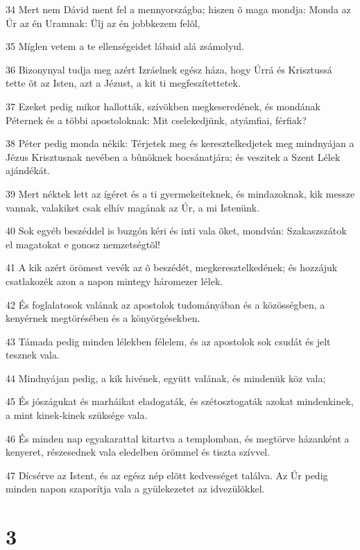 \par 34 Mert nem Dávid ment fel a mennyországba; hiszen õ maga mondja: Monda az Úr az én Uramnak: Ülj az én jobbkezem felõl,
\par 35 Míglen vetem a te ellenségeidet lábaid alá zsámolyul.
\par 36 Bizonynyal tudja meg azért Izráelnek egész háza, hogy Úrrá és Krisztussá tette õt az Isten, azt a Jézust, a kit ti megfeszítettetek.
\par 37 Ezeket pedig mikor hallották, szívökben megkeseredének, és mondának Péternek és a többi apostoloknak: Mit cselekedjünk, atyámfiai, férfiak?
\par 38 Péter pedig monda nékik: Térjetek meg és keresztelkedjetek meg mindnyájan a Jézus Krisztusnak nevében a bûnöknek bocsánatjára; és veszitek a Szent Lélek ajándékát.
\par 39 Mert néktek lett az ígéret és a ti gyermekeiteknek, és mindazoknak, kik messze vannak, valakiket  csak elhív magának az Úr, a mi Istenünk.
\par 40 Sok egyéb beszéddel is buzgón kéri és inti vala õket, mondván: Szakaszszátok el magatokat e gonosz nemzetségtõl!
\par 41 A kik azért örömest vevék az õ beszédét, megkeresztelkedének; és hozzájuk csatlakozék azon a napon mintegy háromezer lélek.
\par 42 És foglalatosok valának az apostolok tudományában és a közösségben, a kenyérnek megtörésében és a könyörgésekben.
\par 43 Támada pedig minden lélekben félelem, és az apostolok sok csudát és jelt tesznek vala.
\par 44 Mindnyájan pedig, a kik hivének, együtt valának, és mindenük köz vala;
\par 45 És jószágukat és marháikat eladogaták, és szétosztogaták azokat mindenkinek, a mint kinek-kinek szüksége vala.
\par 46 És minden nap egyakarattal kitartva a templomban, és megtörve házanként a kenyeret, részesednek vala eledelben örömmel és tiszta szívvel.
\par 47 Dícsérve az Istent, és az egész nép elõtt kedvességet találva. Az Úr pedig minden napon szaporítja vala a gyülekezetet az idvezülõkkel.

\chapter{3}

